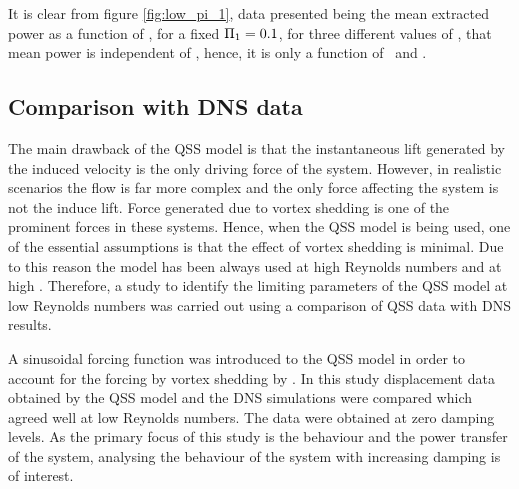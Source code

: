 It is clear from figure \ref{fig:low_pi_1}, data presented being the mean extracted power  as a function of \massdamp, for a fixed $\Pi_1 = 0.1$, for three different values of \mstar, that mean power is independent of \mstar, hence, it is only a function of \massstiff\ and \massdamp.




\subsection{Comparison with DNS data}
\label{sec:chp-pi_1_pi2_dns}

The main drawback of the QSS model is that the instantaneous lift generated by the induced velocity is the only driving force of the system. However, in realistic scenarios the flow is far more complex and the only force affecting the system is not the induce lift. Force generated due to vortex shedding is one of the prominent forces in these systems. Hence, when the QSS model is being used, one of the essential assumptions is that the effect of vortex shedding is minimal. Due to this reason the model has been always used at high Reynolds numbers and at high \mstar. Therefore, a study to identify the limiting parameters of the QSS model at low Reynolds numbers was carried out  using a comparison of QSS data with DNS results.



A sinusoidal forcing function was introduced to the QSS model in order to account for the forcing by vortex shedding by \citet{Joly2012}. In this study displacement data obtained by the QSS model and the DNS simulations were compared which agreed well at low Reynolds numbers. The data were obtained at zero damping levels. As the primary focus of this study is the behaviour and the power transfer of the system, analysing the behaviour of the system with increasing damping is of interest.   

